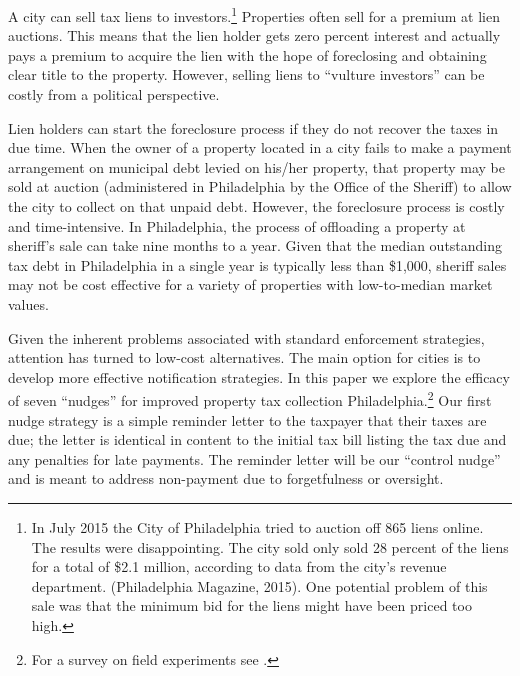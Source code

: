 \documentclass[12pt]{article}
\begin{document}
A city can sell tax liens to investors.\footnote{In July 2015 the City
  of Philadelphia tried to auction off 865 liens online. The results
  were disappointing. The city sold only sold 28 percent of the liens
  for a total of \$2.1 million, according to data from the city's
  revenue department. (Philadelphia Magazine, 2015). One potential
  problem of this sale was that the minimum bid for the liens might
  have been priced too high.} Properties often sell for a premium at
lien auctions. This means that the lien holder gets zero percent
interest and actually pays a premium to acquire the lien with the hope
of foreclosing and obtaining clear title to the property. However,
selling liens to ``vulture investors'' can be costly from a political
perspective.

Lien holders can start the foreclosure process if they do not recover
the taxes in due time. When the owner of a property located in a city
fails to make a payment arrangement on municipal debt levied on
his/her property, that property may be sold at auction (administered
in Philadelphia by the Office of the Sheriff) to allow the city to
collect on that unpaid debt. However, the foreclosure process is
costly and time-intensive. In Philadelphia, the process of offloading
a property at sheriff's sale can take nine months to a year. Given
that the median outstanding tax debt in Philadelphia in a single year
is typically less than \$1,000, sheriff sales may not be cost
effective for a variety of properties with low-to-median market
values.

Given the inherent problems associated with standard enforcement
strategies, attention has turned to low-cost alternatives. The main
option for cities is to develop more effective notification
strategies.  In this paper we explore the efficacy of seven ``nudges''
for improved property tax collection Philadelphia.\footnote{For a
  survey on field experiments see .}  Our
first nudge strategy is a simple reminder letter to the taxpayer that
their taxes are due; the letter is identical in content to the initial
tax bill listing the tax due and any penalties for late payments.  The
reminder letter will be our ``control nudge'' and is meant to address
non-payment due to forgetfulness or oversight.
\end{document}
